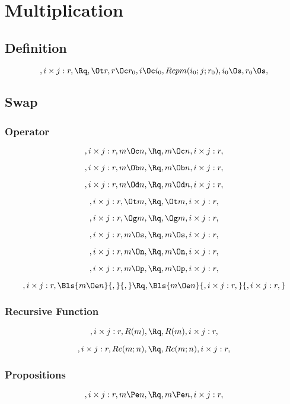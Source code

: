 \chapter{Multiplication}

\bigskip
\bigskip
\section{Definition}
\[, i \times j:r, \Rq , \Ot r, r \Oc r_0, i \Oc i_0, Rcpm(i_0;j;r_0), i_0 \Os, r_0 \Os, \]



\bigskip
\bigskip
\section{Swap}
\subsection{Operator}
\[, i \times j:r, m \Oc n, \Rq , m \Oc n, i \times j:r,\]

\[, i \times j:r, m \Ob n, \Rq , m \Ob n, i \times j:r,\]

\[, i \times j:r, m \Od n, \Rq , m \Od n, i \times j:r,\]

\[, i \times j:r, \Ot m, \Rq , \Ot m, i \times j:r,\]

\[, i \times j:r, \Og m, \Rq , \Og m, i \times j:r,\]

\[, i \times j:r, m \Os, \Rq , m \Os, i \times j:r,\]

\[, i \times j:r, m \On, \Rq , m \On, i \times j:r,\]

\[, i \times j:r, m \Op, \Rq , m \Op, i \times j:r,\]

\[, i \times j:r, \Bls{m \Oe n}{,}{,} \Rq , \Bls{m \Oe n}{, i \times j:r,}{, i \times j:r,}\]


\bigskip
\bigskip
\subsection{Recursive Function}
\[, i \times j:r, R(m), \Rq , R(m), i \times j:r,\]

\[, i \times j:r, Rc(m;n), \Rq , Rc(m;n), i \times j:r,\]



\bigskip
\bigskip
\subsection{Propositions}
\[, i \times j:r, m \Pe n, \Rq , m \Pe n, i \times j:r,\]


